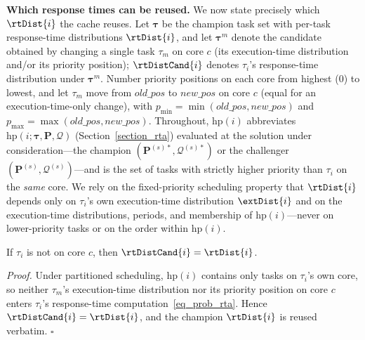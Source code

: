     \textbf{Which response times can be reused.}
    We now state precisely which $\rtDist{i}$ the cache reuses.
    Let $\boldsymbol{\tau}$ be the champion task set with per-task response-time distributions $\rtDist{i}$, and let $\boldsymbol{\tau}^{m}$ denote the candidate obtained by changing a single task $\tau_m$ on core $c$ (its execution-time distribution and/or its priority position); $\rtDistCand{i}$ denotes $\tau_i$'s response-time distribution under $\boldsymbol{\tau}^{m}$.
    Number priority positions on each core from highest ($0$) to lowest, and let $\tau_m$ move from $\mathit{old\_pos}$ to $\mathit{new\_pos}$ on core $c$ (equal for an execution-time-only change), with $p_{\min}=\min(\mathit{old\_pos},\mathit{new\_pos})$ and $p_{\max}=\max(\mathit{old\_pos},\mathit{new\_pos})$.
    Throughout, $\text{hp}(i)$ abbreviates $\text{hp}(i;\boldsymbol{\tau},\boldsymbol{P},\boldsymbol{\mathcal{Q}})$ (Section~\ref{section_rta}) evaluated at the solution under consideration---the champion $(\boldsymbol{P}^{(s)*},\boldsymbol{\mathcal{Q}}^{(s)*})$ or the challenger $(\boldsymbol{P}^{(s)},\boldsymbol{\mathcal{Q}}^{(s)})$---and is the set of tasks with strictly higher priority than $\tau_i$ on the \emph{same} core. We rely on the fixed-priority scheduling property that $\rtDist{i}$ depends only on $\tau_i$'s own execution-time distribution $\extDist{i}$ and on the execution-time distributions, periods, and membership of $\text{hp}(i)$---never on lower-priority tasks or on the order within $\text{hp}(i)$.

    \begin{observation}
    \label{obs:rta_cross_core}
    If $\tau_i$ is not on core $c$, then $\rtDistCand{i} = \rtDist{i}$.
    \end{observation}
    \noindent\textit{Proof.}
    Under partitioned scheduling, $\text{hp}(i)$ contains only tasks on $\tau_i$'s own core, so neither $\tau_m$'s execution-time distribution nor its priority position on core $c$ enters $\tau_i$'s response-time computation~\eqref{eq_prob_rta}.
    Hence $\rtDistCand{i}=\rtDist{i}$, and the champion $\rtDist{i}$ is reused verbatim. \hfill$\square$

